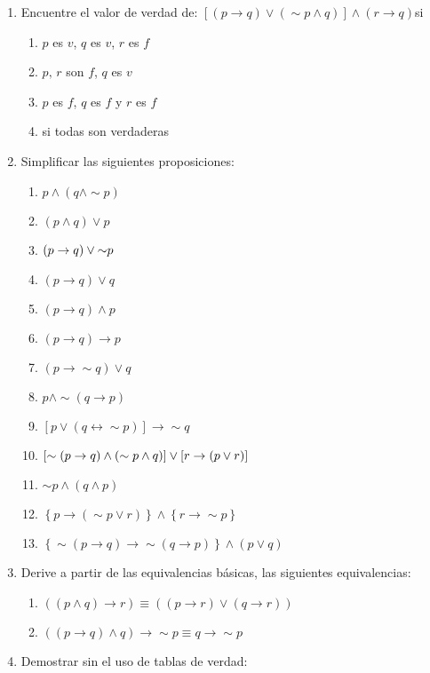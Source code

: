 {\begin{enumerate}
\item Encuentre el valor de verdad de: $\left[\left(p\rightarrow q\right)\vee\left(\sim p\wedge q\right)\right]\wedge\left(r\rightarrow q\right)$si

\begin{enumerate}
\item $p$ es $v$, $q$ es $v$, $r$ es $f$
\item $p,\, r$ son $f$, $q$ es $v$	
\item $p$ es $f$, $q$ es $f$ y $r$ es $f$
\item si todas son verdaderas 	
\end{enumerate}
\item Simplificar las siguientes proposiciones:

\begin{enumerate}
\item $p\wedge$$\left(q\wedge\sim p\right)$ 
\item $\left(p\wedge q\right)\vee p$
\item $\left(p\rightarrow q\right)\vee\text{\ensuremath{\sim}}p$
\item $\left(p\rightarrow q\right)\vee q$
\item $\left(p\rightarrow q\right)\wedge p$
\item $\left(p\rightarrow q\right)\rightarrow p$
\item $\left(p\rightarrow\sim q\right)\vee q$
\item $p\wedge\sim\left(q\rightarrow p\right)$
\item $\left[p\vee\left(q\leftrightarrow\sim p\right)\right]\rightarrow\sim q$
\item $\left[\text{\ensuremath{\sim\left(p\rightarrow q\right)}}\wedge\left(\sim p\wedge q\right)\right]\vee\left[r\rightarrow\left(p\vee r\right)\right]$
\item $\sim p\wedge\left(q\wedge p\right)$
\item $\left\{ p\rightarrow\left(\sim p\vee r\right)\right\} \wedge\left\{ r\rightarrow\sim p\right\} $
\item $\left\{ \sim\left(p\rightarrow q\right)\rightarrow\sim\left(q\rightarrow p\right)\right\} \wedge\left(p\vee q\right)$
\end{enumerate}
\item Derive a partir de las equivalencias básicas, las siguientes equivalencias: 

\begin{enumerate}
\item $\left(\left(p\wedge q\right)\rightarrow r\right)\equiv\left(\left(p\rightarrow r\right)\vee\left(q\rightarrow r\right)\right)$
\item $\left(\left(p\rightarrow q\right)\wedge q\right)\rightarrow\sim p\equiv q\rightarrow\sim p$
\end{enumerate}
\item Demostrar sin el uso de tablas de verdad: 


\end{enumerate}}
